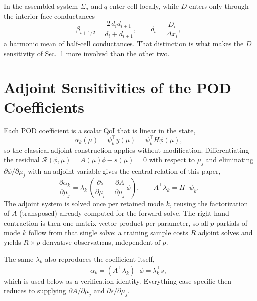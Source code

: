 \documentclass[]{ANStopical}
\begin{document}
In the assembled system $\Sigma_a$ and $q$ enter cell-locally, while $D$ enters only through the interior-face conductances
\begin{equation}
    \beta_{i+1/2} = \frac{2\,d_i d_{i+1}}{d_i+d_{i+1}},
    \qquad d_i = \frac{D_i}{\Delta x_i},
    \label{eq:beta}
\end{equation}
a harmonic mean of half-cell conductances. That distinction is what makes the $D$ sensitivity of Sec.~\ref{sec:adjoint} more involved than the other two.


\section{Adjoint Sensitivities of the POD Coefficients}\label{sec:adjoint}

Each POD coefficient is a scalar QoI that is linear in the state,
\begin{equation}
    \alpha_k(\mu) = \psi_k^\top y(\mu) = \psi_k^\top H\phi(\mu),
    \label{eq:alphak}
\end{equation}
so the classical adjoint construction \cite{cacuci_sensitivity} applies without modification. Differentiating the residual $\mathcal{R}(\phi,\mu)=A(\mu)\phi-s(\mu)=0$ with respect to $\mu_j$ and eliminating $\partial\phi/\partial\mu_j$ with an adjoint variable gives the central relation of this paper,
\begin{equation}
    \boxed{\;
    \frac{\partial\alpha_k}{\partial\mu_j}
    = \lambda_k^\top\!\left(\frac{\partial s}{\partial\mu_j} - \frac{\partial A}{\partial\mu_j}\,\phi\right),
    \qquad
    A^\top\lambda_k = H^\top\psi_k .
    \;}
    \label{eq:adjoint}
\end{equation}
The adjoint system is solved once per retained mode $k$, reusing the factorization of $A$ (transposed) already computed for the forward solve. The right-hand contraction is then one matrix-vector product per parameter, so all $p$ partials of mode $k$ follow from that single solve: a training sample costs $R$ adjoint solves and yields $R\times p$ derivative observations, independent of $p$.

The same $\lambda_k$ also reproduces the coefficient itself,
\begin{equation}
    \alpha_k = \left(A^\top\lambda_k\right)^{\!\top}\phi = \lambda_k^\top s,
    \label{eq:identity}
\end{equation}
which is used below as a verification identity. Everything case-specific then reduces to supplying $\partial A/\partial\mu_j$ and $\partial s/\partial\mu_j$.
\end{document}
